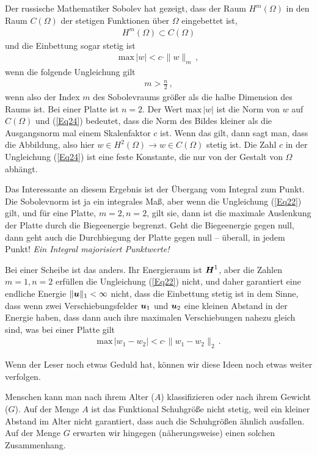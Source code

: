 Der russische Mathematiker Sobolev hat gezeigt, dass der Raum $H^m(\Omega)$ in den Raum $C(\Omega)$ der stetigen Funktionen \"{u}ber $\Omega$ eingebettet ist,
\begin{align}
H^m(\Omega) \subset C(\Omega)
\end{align}
und die Einbettung sogar stetig ist
\begin{align} \label{Eq24}
\text{max}\, |w| < c \cdot \|w\|_m\,,
\end{align}
wenn die folgende Ungleichung gilt
\begin{align} \label{Eq22}
m > \frac{n}{2}\,,
\end{align}
wenn also der Index $m$ des Sobolevraums gr\"{o}{\ss}er als die \glq halbe Dimension\grq{} des Raums ist. Bei einer Platte ist $n = 2$. Der Wert $\text{max}\, |w|$ ist die Norm von $w$ auf $C(\Omega)$ und (\ref{Eq24}) bedeutet, dass die Norm des Bildes kleiner als die Ausgangsnorm mal einem Skalenfaktor $c$ ist. Wenn das gilt, dann sagt man, dass die Abbildung, also hier $w \in H^2(\Omega) \to w \in C(\Omega)$ stetig ist. Die Zahl $c$ in der Ungleichung (\ref{Eq24}) ist eine feste Konstante, die nur von der Gestalt von $\Omega$ abh\"{a}ngt.

Das Interessante an diesem Ergebnis ist der \"{U}bergang vom Integral zum Punkt. Die Sobolevnorm ist ja ein integrales Ma{\ss}, aber wenn die Ungleichung (\ref{Eq22}) gilt, und f\"{u}r eine Platte, $m = 2, n = 2$, gilt sie, dann ist die maximale Auslenkung der Platte durch die Biegeenergie begrenzt. Geht die Biegeenergie gegen null, dann geht auch die Durchbiegung der Platte gegen null -- \"{u}berall, in jedem Punkt! {\em Ein Integral majorisiert Punktwerte!\/}

Bei einer Scheibe ist das anders. Ihr Energieraum ist $\mbox{\boldmath $H$}^1$, aber die Zahlen $m = 1, n = 2$ erf\"{u}llen die Ungleichung (\ref{Eq22}) nicht, und daher garantiert eine endliche Energie $\|\mbox{\boldmath $u$}\|_1 < \infty$ nicht, dass die Einbettung stetig ist in dem Sinne, dass wenn zwei Verschiebungsfelder $\mbox{\boldmath $u$}_1$ und $\mbox{\boldmath $u$}_2$ eine kleinen Abstand in der Energie haben, dass dann auch ihre maximalen Verschiebungen nahezu gleich sind, was bei einer Platte gilt
\begin{align}
\text{max}\,  |w_1 - w_2|  < c \cdot \|w_1 - w_2\|_2\,.
\end{align}

Wenn der Leser noch etwas Geduld hat, k\"{o}nnen wir diese Ideen noch etwas weiter verfolgen.

Menschen kann man nach ihrem Alter ($A$) klassifizieren oder nach ihrem Gewicht ($G$). Auf der Menge $A$ ist das Funktional \glq Schuhgr\"{o}{\ss}e\grq{} nicht stetig, weil ein kleiner Abstand im Alter nicht garantiert, dass auch die Schuhgr\"{o}{\ss}en \"{a}hnlich ausfallen. Auf der Menge $G$ erwarten wir hingegen (n\"{a}herungsweise) einen solchen Zusammenhang.

